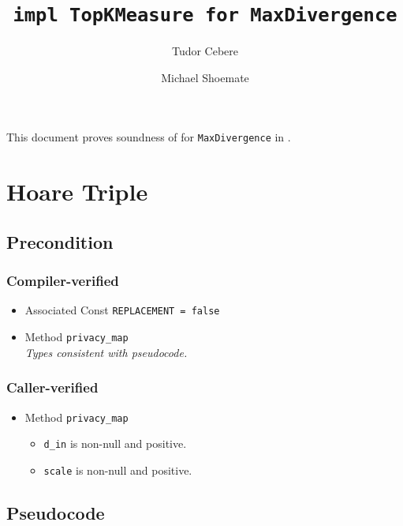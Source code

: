 \documentclass{article}
\title{\texttt{impl TopKMeasure for MaxDivergence}}
\author{Tudor Cebere \and Michael Shoemate}
\begin{document}
\maketitle
\contrib

This document proves soundness of  for \texttt{MaxDivergence} in .

\section{Hoare Triple}
\subsection*{Precondition}
\subsubsection*{Compiler-verified}
\begin{itemize}
    \item Associated Const \texttt{REPLACEMENT = false}
    \item Method \texttt{privacy\_map} \\
        \textit{Types consistent with pseudocode.}
\end{itemize}

\subsubsection*{Caller-verified}
\begin{itemize}
    \item Method \texttt{privacy\_map}
        \begin{itemize}
            \item \texttt{d\_in} is non-null and positive.
            \item \texttt{scale} is non-null and positive.
        \end{itemize}
\end{itemize}

\subsection*{Pseudocode}
\label{sec:python-pseudocode}

\end{document}
